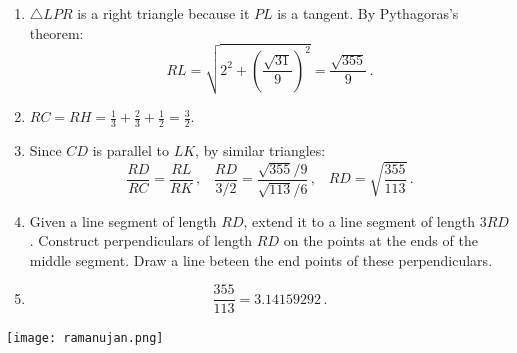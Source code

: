 \documentclass[11pt,a4paper]{report}
\begin{document}
\begin{enumerate}
\item $\triangle LPR$ is a right triangle because it $PL$ is a tangent. By Pythagoras's theorem:
\[
RL=\sqrt{2^2+\left(\frac{\sqrt{31}}{9}\right)^2} = \frac{\sqrt{355}}{9}\,.
\]

\item $RC=RH=\displaystyle\frac{1}{3}+\frac{2}{3}+\frac{1}{2}=\frac{3}{2}$.

\item Since $CD$ is parallel to $LK$, by similar triangles:
\[
\frac{RD}{RC}=\frac{RL}{RK}\,,\;\;\;\frac{RD}{3/2}=\frac{\sqrt{355}/9}{\sqrt{113}/6}\,,\;\;\;RD=\sqrt{\frac{355}{113}}\,.
\]

\item Given a line segment of length $RD$, extend it to a line segment of length $3RD$. Construct perpendiculars of length $RD$ on the points at the ends of the middle segment. Draw a line beteen the end points of these perpendiculars.

\begin{center}
\end{center}

\item \mbox{}
\[
\frac{355}{113}=3.14159292\,.
\]

\end{enumerate}

\newpage

\hspace*{-5em}\texttt{[image: ramanujan.png]}
\end{document}
